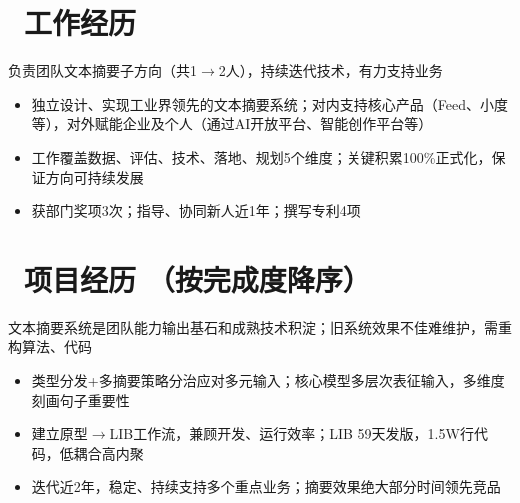 \documentclass{resume}
\begin{document}



\section{\faHistory\ 工作经历}

\begin{onehalfspacing}
负责团队文本摘要子方向（共1$ \rightarrow $2人），持续迭代技术，有力支持业务
\begin{itemize}
  \item 独立设计、实现工业界领先的文本摘要系统；对内支持核心产品（Feed、小度等），对外赋能企业及个人（通过AI开放平台、智能创作平台等）
  \item 工作覆盖数据、评估、技术、落地、规划5个维度；关键积累100\%正式化，保证方向可持续发展
  \item 获部门奖项3次；指导、协同新人近1年；撰写专利4项
\end{itemize}
\end{onehalfspacing}

\section{\faUsers\ 项目经历 \small（按完成度降序）}
\begin{onehalfspacing}
文本摘要系统是团队能力输出基石和成熟技术积淀；旧系统效果不佳难维护，需重构算法、代码
\begin{itemize}
  \item 类型分发+多摘要策略分治应对多元输入；核心模型多层次表征输入，多维度刻画句子重要性
  \item 建立原型$\rightarrow$LIB工作流，兼顾开发、运行效率；LIB 59天发版，1.5W行代码，低耦合高内聚
  \item 迭代近2年，稳定、持续支持多个重点业务；摘要效果绝大部分时间领先竞品
\end{itemize}
\end{onehalfspacing}
\end{document}

